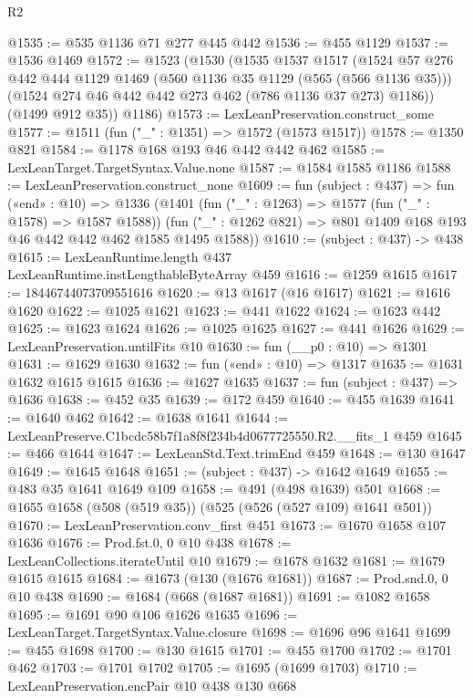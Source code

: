 \begin{lexlean}{R2}
\begin{coremodule}
@1535 := @535 @1136 @71 @277 @445 @442
@1536 := @455 @1129
@1537 := @1536 @1469
@1572 := @1523
    (@1530
      (@1535
        @1537
        @1517
        (@1524
          @57
          @276
          @442
          @444
          @1129
          @1469
          (@560 @1136 @35 @1129 (@565 (@566 @1136 @35)))
          (@1524 @274 @46 @442 @442 @273 @462 (@786 @1136 @37 @273) @1186))
        (@1499 @912 @35))
      @1186)
@1573 := LexLeanPreservation.construct_some
@1577 := @1511 (fun ("_" : @1351) => @1572 (@1573 @1517))
@1578 := @1350 @821
@1584 := @1178 @168 @193 @46 @442 @442 @462
@1585 := LexLeanTarget.TargetSyntax.Value.none
@1587 := @1584 @1585 @1186
@1588 := LexLeanPreservation.construct_none
@1609 := fun (subject : @437) =>
  fun («end» : @10) =>
  @1336
    (@1401
      (fun ("_" : @1263) => @1577 (fun ("_" : @1578) => @1587 @1588))
      (fun ("_" : @1262 @821) => @801 @1409 @168 @193 @46 @442 @442 @462 @1585 @1495 @1588))
@1610 := (subject : @437) -> @438
@1615 := LexLeanRuntime.length @437 LexLeanRuntime.instLengthableByteArray @459
@1616 := @1259 @1615
@1617 := 18446744073709551616
@1620 := @13 @1617 (@16 @1617)
@1621 := @1616 @1620
@1622 := @1025 @1621
@1623 := @441 @1622
@1624 := @1623 @442
@1625 := @1623 @1624
@1626 := @1025 @1625
@1627 := @441 @1626
@1629 := LexLeanPreservation.untilFits @10
@1630 := fun (__p0 : @10) => @1301
@1631 := @1629 @1630
@1632 := fun («end» : @10) => @1317
@1635 := @1631 @1632 @1615 @1615
@1636 := @1627 @1635
@1637 := fun (subject : @437) => @1636
@1638 := @452 @35
@1639 := @172 @459
@1640 := @455 @1639
@1641 := @1640 @462
@1642 := @1638 @1641
@1644 := LexLeanPreserve.C1bcdc58b7f1a8f8f234b4d0677725550.R2.__fits_1 @459
@1645 := @466 @1644
@1647 := LexLeanStd.Text.trimEnd @459
@1648 := @130 @1647
@1649 := @1645 @1648
@1651 := (subject : @437) -> @1642 @1649
@1655 := @483 @35 @1641 @1649 @109
@1658 := @491 (@498 @1639) @501
@1668 := @1655 @1658 (@508 (@519 @35)) (@525 (@526 (@527 @109) @1641 @501))
@1670 := LexLeanPreservation.conv_first @451
@1673 := @1670 @1658 @107 @1636
@1676 := Prod.fst.{0, 0} @10 @438
@1678 := LexLeanCollections.iterateUntil @10
@1679 := @1678 @1632
@1681 := @1679 @1615 @1615
@1684 := @1673 (@130 (@1676 @1681))
@1687 := Prod.snd.{0, 0} @10 @438
@1690 := @1684 (@668 (@1687 @1681))
@1691 := @1082 @1658
@1695 := @1691 @90 @106 @1626 @1635
@1696 := LexLeanTarget.TargetSyntax.Value.closure
@1698 := @1696 @96 @1641
@1699 := @455 @1698
@1700 := @130 @1615
@1701 := @455 @1700
@1702 := @1701 @462
@1703 := @1701 @1702
@1705 := @1695 (@1699 @1703)
@1710 := LexLeanPreservation.encPair @10 @438 @130 @668

\end{coremodule}
\end{lexlean}
